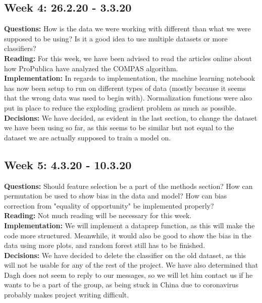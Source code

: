 \documentclass[11pt, fleqn]{article}
\begin{document}
\subsection*{Week 4: 26.2.20 - 3.3.20}
\textbf{Questions:} How is the data we were working with different than what we were supposed to be using? Is it a good idea to use multiple datasets or more classifiers? \\
\textbf{Reading:} For this week, we have been advised to read the articles online about how ProPublica have analyzed the COMPAS algorithm. \\
\textbf{Implementation:} In regards to implementation, the machine learning notebook has now been setup to run on different types of data (mostly because it seems that the wrong data was used to begin with). Normalization functions were also put in place to reduce the exploding gradient problem as much as possible. \\
\textbf{Decisions:} We have decided, as evident in the last section, to change the dataset we have been using so far, as this seems to be similar but not equal to the dataset we are actually supposed to train a model on. \\

\subsection*{Week 5: 4.3.20 - 10.3.20}
\textbf{Questions:} Should feature selection be a part of the methods section? How can permutation be used to show bias in the data and model? How can bias correction from "equality of opportunity" be implemented properly? \\ 
\textbf{Reading:} Not much reading will be necessary for this week. \\
\textbf{Implementation:} We will implement a dataprep function, as this will make the code more structured. Meanwhile, it would also be good to show the bias in the data using more plots, and random forest still has to be finished. \\
\textbf{Decisions:} We have decided to delete the classifier on the old dataset, as this will not be usable for any of the rest of the project. We have also determined that Dagh does not seem to reply to our messages, so we will let him contact us if he wants to be a part of the group, as being stuck in China due to coronavirus probably makes project writing difficult.
\end{document}
